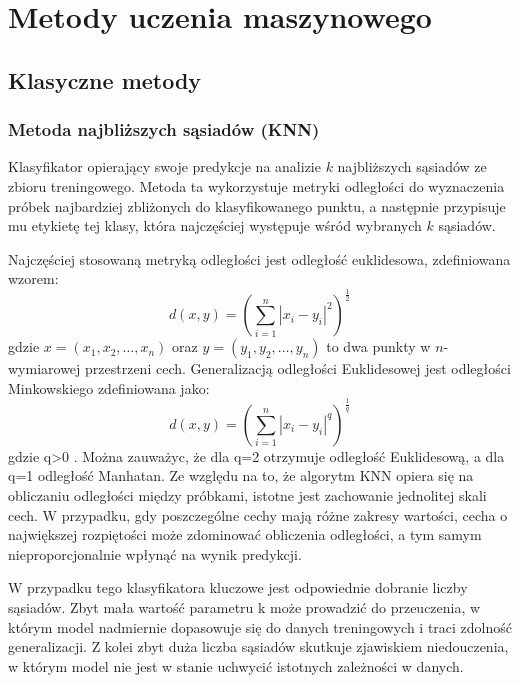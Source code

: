 \documentclass[a4paper,twoside,12pt]{book}
\begin{document}
\chapter{Metody uczenia maszynowego}
\section{Klasyczne metody}

\subsection*{Metoda najbliższych sąsiadów (KNN)}
Klasyfikator opierający swoje predykcje na analizie $k$ najbliższych sąsiadów ze zbioru treningowego. Metoda ta wykorzystuje metryki odległości do wyznaczenia próbek najbardziej zbliżonych do klasyfikowanego punktu, a następnie przypisuje mu etykietę tej klasy, która najczęściej występuje wśród wybranych $k$ sąsiadów.

Najczęściej stosowaną metryką odległości jest odległość euklidesowa, zdefiniowana wzorem:
\begin{equation}
	d(x, y) = \left( \sum_{i=1}^{n} |x_i - y_i|^{2} \right)^{\frac{1}{2}}
\end{equation}
gdzie $x = (x_1, x_2, \ldots, x_n)$ oraz $y = (y_1, y_2, \ldots, y_n)$ to dwa punkty w $n$-wymiarowej przestrzeni cech. Generalizacją odległości Euklidesowej jest odległości Minkowskiego zdefiniowana jako:
\begin{equation}
	d(x, y) = \left( \sum_{i=1}^{n} |x_i - y_i|^{q} \right)^{\frac{1}{q}}
\end{equation}
gdzie q>0 \cite{liu2007web}. Można zauważyc, że dla q=2 otrzymuje odległość Euklidesową, a dla q=1 odległość Manhatan.
Ze względu na to, że algorytm KNN opiera się na obliczaniu odległości między próbkami, istotne jest zachowanie jednolitej skali cech. W przypadku, gdy poszczególne cechy mają różne zakresy wartości, cecha o największej rozpiętości może zdominować obliczenia odległości, a tym samym nieproporcjonalnie wpłynąć na wynik predykcji.

W przypadku tego klasyfikatora kluczowe jest odpowiednie dobranie liczby sąsiadów. Zbyt mała wartość parametru k może prowadzić do przeuczenia, w którym model nadmiernie dopasowuje się do danych treningowych i traci zdolność generalizacji. Z kolei zbyt duża liczba sąsiadów skutkuje zjawiskiem niedouczenia, w którym model nie jest w stanie uchwycić istotnych zależności w danych\cite{kuhn2013applied}.
\end{document}
